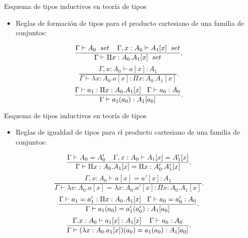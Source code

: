 \documentclass[dvipsnames, 8pt]{beamer} %
\theoremstyle{plain}
\theoremstyle{definition}
\begin{document}
\begin{frame}{Esquema de tipos inductivos en teoría de tipos}
    \begin{itemize}
        \item Reglas de formación de tipos para el producto cartesiano de una familia de conjuntos:\pause
    \end{itemize}
        \[
            \frac{\Gamma\vdash A_{0} \hspace{2mm} set \hspace{4mm} \Gamma, x:A_{0}\vdash A_{1}[x] \hspace{2mm} set}{\Gamma \vdash \Pi x:A_{0}.A_{1}[x] \hspace{2mm}set}
        .\]
        \vspace{2mm}
        \[
            \frac{\Gamma, x:A_{0}\vdash a[x]:A_{1}}{\Gamma \vdash \lambda x:A_{0}.a[x] : \Pi x:A_{0}.A_{1}[x]} 
        .\]
        \vspace{2mm}
        \[
            \frac{\Gamma \vdash a_{1}: \Pi x:A_{0}.A_{1}[x] \hspace{3mm} \Gamma\vdash a_{0}:A_{0}}{\Gamma \vdash a_{1}(a_{0}) : A_{1}[a_{0}]}
        .\]
\end{frame}

\begin{frame}{Esquema de tipos inductivos en teoría de tipos}
    \begin{itemize}
        \item Reglas de igualdad de tipos para el producto cartesiano de una familia de conjuntos:\pause
    \end{itemize}
        \[
            \frac{\Gamma\vdash A_{0} = A_{0}' \hspace{4mm} \Gamma, x:A_{0}\vdash A_{1}[x] = A_{1}'[x]}{\Gamma \vdash \Pi x:A_{0}.A_{1}[x] = \Pi x:A_{0}'.A_{1}'[x]}
        .\]
        \vspace{2mm}
        \[
            \frac{\Gamma, x:A_{0}\vdash a[x] = a'[x] : A_{1}}{\Gamma \vdash \lambda x:A_{0}.a[x] = \lambda x:A_{0}.a'[x] : \Pi x:A_{0}.A_{1}[x]}
        .\]
        \vspace{2mm}
        \[
            \frac{\Gamma \vdash a_{1} = a_{1}' : \Pi x:A_{0}.A_{1}[x] \hspace{3mm} \Gamma \vdash a_{0} = a_{0}':A_{0}}{\Gamma \vdash a_{1}(a_{0}) = a_{1}'(a_{0}'): A_1[a_{0}]}
        .\]
        \vspace{2mm}
        \[
            \frac{\Gamma.x:A_{0}\vdash a_{1}[x]: A_{1}[x] \hspace{4mm} \Gamma\vdash a_{0} : A_{0}}{\Gamma\vdash(\lambda x:A_{0}.a_1[x])(a_{0}) = a_{1}(a_{0}) : A_{1}[a_{0}]}
        .\]
\end{frame}
\end{document}
